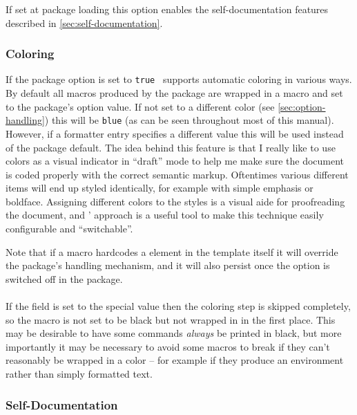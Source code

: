 \documentclass[12pt]{scrartcl}
\begin{document}
If set at package loading this option enables the self-documentation features
described in \vref{sec:self-documentation}.


\subsubsection{Coloring}
\label{sec:coloring}

If the package option  is set to \texttt{true}
\luatemplates\ supports automatic coloring in various ways.  By default
all macros produced by the package are wrapped in a  macro and
set to the package's  option value.  If not set to a
different color (see \vref{sec:option-handling}) this will be \texttt{blue}
(as can be seen throughout most of this manual).  However, if a formatter entry
specifies a different  value this will be used instead of the
package default.  The idea behind this feature is that I really like to use
colors as a visual indicator in “draft” mode to help me make sure the document
is coded properly with the correct semantic markup.  Oftentimes various
different items will end up styled identically, for example with simple emphasis
or boldface.  Assigning different colors to the styles is a visual aide for
proofreading the document, and \luatemplates' approach is a useful tool
to make this technique easily configurable and “switchable”.

Note that if a macro hardcodes a  element in the template itself
it will override the package's handling mechanism, and it will also persist once
the  option is switched off in the package.


\paragraph{}

If the  field is set to the special value  then
the coloring step is skipped completely, so the macro is not set to be black but
not wrapped in  in the first place.  This may be desirable to
have some commands \emph{always} be printed in black, but more importantly it
may be necessary to avoid some macros to break if they can't reasonably be
wrapped in a color -- for example if they produce an environment rather than
simply formatted text.


\subsubsection{Self-Documentation}
\label{sec:self-documentation}
\end{document}

